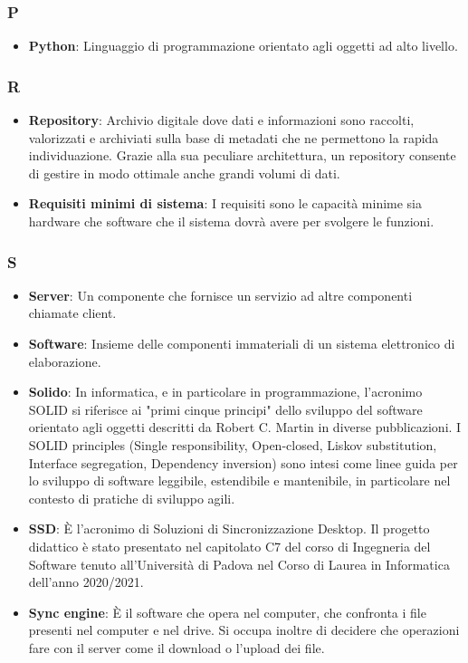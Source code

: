 \subsubsection*{P}
\begin{itemize}
	\item \textbf{Python}: Linguaggio di programmazione orientato agli oggetti ad alto livello.
\end{itemize}

\subsubsection*{R}
\begin{itemize}
	\item \textbf{Repository}: Archivio digitale dove dati e informazioni sono raccolti, valorizzati e archiviati sulla base di metadati che ne permettono la rapida individuazione. Grazie alla sua peculiare architettura, un repository consente di gestire in modo ottimale anche grandi volumi di dati.
	\item \textbf{Requisiti minimi di sistema}: I requisiti sono le capacità minime sia hardware che software che il sistema dovrà avere per svolgere le funzioni.
\end{itemize}

\subsubsection*{S}
\begin{itemize}
	\item \textbf{Server}: Un componente che fornisce un servizio ad altre componenti chiamate client.
	\item \textbf{Software}: Insieme delle componenti immateriali di un sistema elettronico di elaborazione.
	\item \textbf{Solido}: In informatica, e in particolare in programmazione, l'acronimo SOLID si riferisce ai "primi cinque principi" dello sviluppo del software orientato agli oggetti descritti da Robert C. Martin in diverse pubblicazioni. I SOLID principles (Single responsibility, Open-closed, Liskov substitution, Interface segregation, Dependency inversion) sono intesi come linee guida per lo sviluppo di software leggibile, estendibile e mantenibile, in particolare nel contesto di pratiche di sviluppo agili.
	\item \textbf{SSD}: È l'acronimo di Soluzioni di Sincronizzazione Desktop. Il progetto didattico è stato presentato nel capitolato C7 del corso di Ingegneria del Software tenuto all'Università di Padova nel Corso di Laurea in Informatica dell'anno 2020/2021.
	\item \textbf{Sync engine}: È il software che opera nel computer, che confronta i file presenti nel computer e nel drive. Si occupa inoltre di decidere che operazioni fare con il server come il download o l'upload dei file.
\end{itemize}

